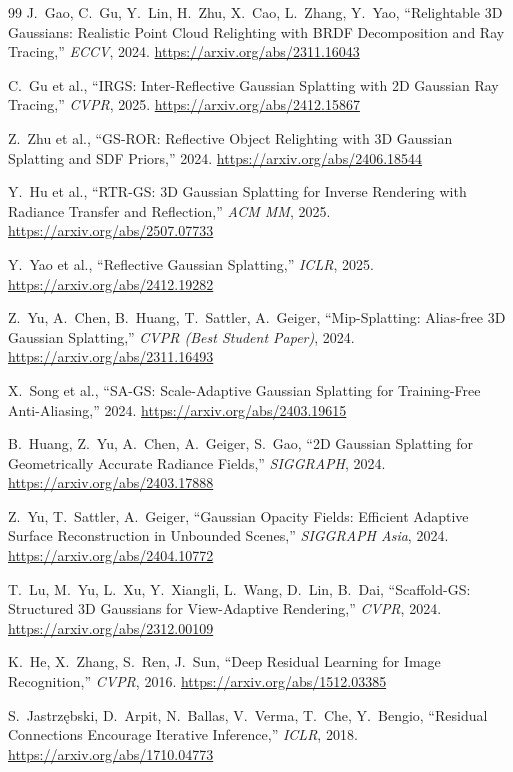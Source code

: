 \begin{thebibliography}{99}
 J.~Gao, C.~Gu, Y.~Lin, H.~Zhu, X.~Cao, L.~Zhang, Y.~Yao,
``Relightable 3D Gaussians: Realistic Point Cloud Relighting with BRDF Decomposition
and Ray Tracing,'' \textit{ECCV}, 2024. \url{https://arxiv.org/abs/2311.16043}

 C.~Gu et al., ``IRGS: Inter-Reflective Gaussian Splatting with 2D
Gaussian Ray Tracing,'' \textit{CVPR}, 2025. \url{https://arxiv.org/abs/2412.15867}

 Z.~Zhu et al., ``GS-ROR: Reflective Object Relighting with 3D
Gaussian Splatting and SDF Priors,'' 2024. \url{https://arxiv.org/abs/2406.18544}

 Y.~Hu et al., ``RTR-GS: 3D Gaussian Splatting for Inverse Rendering
with Radiance Transfer and Reflection,'' \textit{ACM MM}, 2025.
\url{https://arxiv.org/abs/2507.07733}

 Y.~Yao et al., ``Reflective Gaussian Splatting,'' \textit{ICLR},
2025. \url{https://arxiv.org/abs/2412.19282}

 Z.~Yu, A.~Chen, B.~Huang, T.~Sattler, A.~Geiger,
``Mip-Splatting: Alias-free 3D Gaussian Splatting,'' \textit{CVPR (Best Student
Paper)}, 2024. \url{https://arxiv.org/abs/2311.16493}

 X.~Song et al., ``SA-GS: Scale-Adaptive Gaussian Splatting for
Training-Free Anti-Aliasing,'' 2024. \url{https://arxiv.org/abs/2403.19615}

 B.~Huang, Z.~Yu, A.~Chen, A.~Geiger, S.~Gao, ``2D Gaussian
Splatting for Geometrically Accurate Radiance Fields,'' \textit{SIGGRAPH}, 2024.
\url{https://arxiv.org/abs/2403.17888}

 Z.~Yu, T.~Sattler, A.~Geiger, ``Gaussian Opacity Fields: Efficient
Adaptive Surface Reconstruction in Unbounded Scenes,'' \textit{SIGGRAPH Asia}, 2024.
\url{https://arxiv.org/abs/2404.10772}

 T.~Lu, M.~Yu, L.~Xu, Y.~Xiangli, L.~Wang, D.~Lin, B.~Dai,
``Scaffold-GS: Structured 3D Gaussians for View-Adaptive Rendering,'' \textit{CVPR},
2024. \url{https://arxiv.org/abs/2312.00109}

 K.~He, X.~Zhang, S.~Ren, J.~Sun, ``Deep Residual Learning for Image
Recognition,'' \textit{CVPR}, 2016. \url{https://arxiv.org/abs/1512.03385}

 S.~Jastrzębski, D.~Arpit, N.~Ballas, V.~Verma, T.~Che,
Y.~Bengio, ``Residual Connections Encourage Iterative Inference,'' \textit{ICLR},
2018. \url{https://arxiv.org/abs/1710.04773}


\end{thebibliography}
